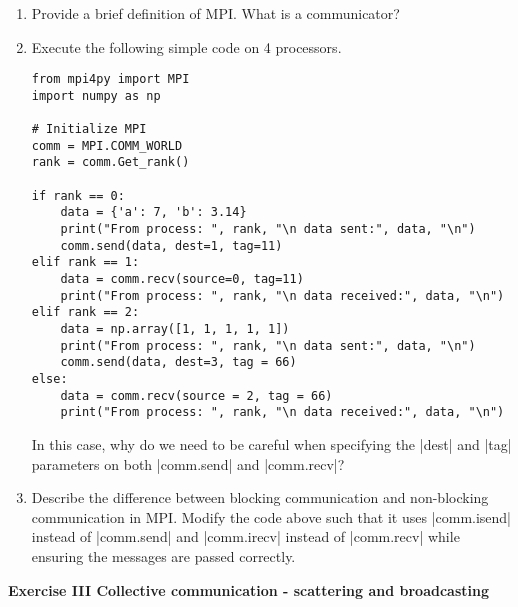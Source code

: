 \documentclass[11pt]{article}
\begin{document}
\begin{enumerate}
    \item Provide a brief definition of MPI. What is a communicator?
    \item Execute the following simple code on 4 processors.
    \begin{verbatim}
from mpi4py import MPI
import numpy as np

# Initialize MPI
comm = MPI.COMM_WORLD
rank = comm.Get_rank()

if rank == 0:
    data = {'a': 7, 'b': 3.14}
    print("From process: ", rank, "\n data sent:", data, "\n")
    comm.send(data, dest=1, tag=11)
elif rank == 1:
    data = comm.recv(source=0, tag=11)
    print("From process: ", rank, "\n data received:", data, "\n")
elif rank == 2:
    data = np.array([1, 1, 1, 1, 1])
    print("From process: ", rank, "\n data sent:", data, "\n")
    comm.send(data, dest=3, tag = 66)
else:
    data = comm.recv(source = 2, tag = 66)
    print("From process: ", rank, "\n data received:", data, "\n")
    \end{verbatim}
    In this case, why do we need to be careful when specifying the |dest| and |tag| parameters on both |comm.send| and |comm.recv|?
    \item Describe the difference between blocking communication and non-blocking communication in MPI. Modify the code above such that it uses |comm.isend| instead of |comm.send| and |comm.irecv| instead of |comm.recv| while ensuring the messages are passed correctly. 
\end{enumerate}

\bigskip

{\bf{Exercise III Collective communication - scattering and broadcasting}}\\
\end{document}
